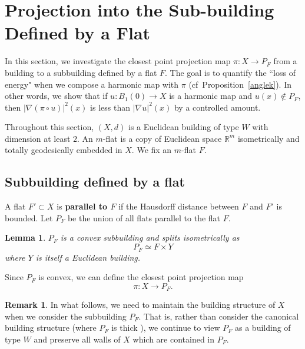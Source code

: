 \documentclass[12pt]{amsart}
\newtheorem{lemma}[theorem]{Lemma}
\theoremstyle{definition}
\newtheorem{remark}[theorem]{Remark}
\numberwithin{equation}{section}
\newcommand{\R}{\mathbb R}
\newcommand{\PF}{P_F}
\newcommand{\FY}{F \times Y}
\begin{document}


\section{Projection into the Sub-building Defined by a Flat}
\label{sec:proj}
In this section, we investigate the closest point projection map $\pi:X \to \PF$ from a building to a subbuilding defined by a flat $F$. The goal is to  quantify the ``loss of energy"  when we compose a harmonic map with $\pi$ (cf~Proposition~\ref{anglek}).  In other words, we show that if $u:B_1(0) \to X$ is a harmonic map and $u(x) \notin \PF$, then  $|\nabla(\pi \circ u)|^2(x)$ is less than  $|\nabla u|^2(x)$  by a controlled amount.

Throughout this section, $(X,d)$ is a Euclidean building of type $W$ with dimension  at least $2$.   An $m$-flat is a copy of Euclidean space $\R^m$ isometrically and totally geodesically embedded in $X$.  We  fix an $m$-flat $F$. 

\subsection{Subbuilding defined by a flat}
A flat $F' \subset X$ is {\bf parallel to $F$} if the Hausdorff distance between $F$ and $F'$ is bounded.  Let $\PF$ be the union of all flats parallel to the flat $F$. 

\begin{lemma}\cite[Proposition 4.8.1]{kleiner-leeb} \label{Xnot}
$\PF$ is a convex subbuilding  and splits isometrically as 
\begin{equation} \label{ftimesy}
\PF \simeq \FY
\end{equation}
where  $Y$ is itself a Euclidean building.
\end{lemma}

Since $P_F$ is convex, we can define the closest point projection map
$$\pi:X \rightarrow \PF.$$

\begin{remark}\label{rem:thick}
In what follows, we need to maintain the building structure of $X$ when we consider the subbuilding $\PF$. That is, rather than consider the canonical building structure (where $\PF$ is thick \cite[Proposition 4.9.2]{kleiner-leeb}), we continue to view $\PF$ as a building of type $W$ and preserve all walls of $X$ which are contained in $\PF$. 
\end{remark}
\end{document}
